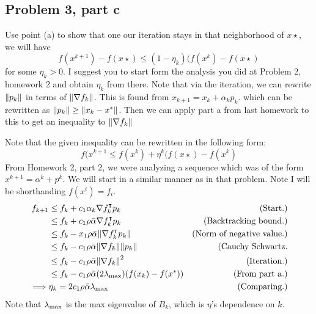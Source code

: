 \subsection{Problem 3, part c}
Use point (a) to show that one our iteration stays in that neighborhood of $x\star$, we will have
\[f(x^{k+1}) - f(x\star) \leq ( 1 - \eta_k)(f(x^k) - f(x\star)\]
for some $\eta_k > 0$. I suggest you to start form the analysis you did at Problem 2, homework 2 and obtain $\eta_k$ from there. Note that via the iteration, we can rewrite $\norm{p_k}$ in terms of $\norm{\nabla f_k}$. This is found from $x_{k+1} = x_k + \alpha_k p_k$. which can be rewritten as $\norm{p_k} \geq \norm{x_k - x^{*}}$. Then we can apply part a from last homework to this to get an inequality to $\norm{\nabla f_k}$
\partbreak
\begin{solution}

    Note that the given inequality can be rewritten in the following form:
    \[f(x^{k+1} \leq f(x^k) + \eta^k (f(x\star) - f(x^k)\]
    From Homework 2, part 2, we were analyzing a sequence which was of the form $x^{k+1} = \alpha^k + p^k$. We will start in a similar manner as in that problem. Note I will be shorthanding $f(x^i) = f_i$. 
    \tightalignbreak
    \begin{align*}
        f_{k+1} &\leq f_k + c_1\alpha_k \nabla f_k^\intercal p_k &\text{(Start.)}\\
        &\leq f_k + c_1\rho \Bar{\alpha} \nabla f_k^\intercal p_k &\text{(Backtracking bound.)}\\
        &\leq f_k - x_1\rho\Bar{\alpha} \norm{\nabla f_k^\intercal p_k} &\text{(Norm of negative value.)}\\
        &\leq f_k - c_1 \rho\Bar{\alpha}\norm{\nabla f_k} \norm{p_k} &\text{(Cauchy Schwartz.}\\
        &\leq f_k - c_1 \rho \Bar{\alpha} \norm{\nabla f_k}^2 &\text{(Iteration.)}\\
        &\leq f_k - c_1 \rho\Bar{\alpha}(2\mathrm{\lambda}_{\max})(f(x_k) - f(x^{*})) &\text{(From part a.)}\\
        \implies& \eta_k = 2c_1\rho\Bar{\alpha}\mathrm{\lambda}_{\max} &\text{(Comparing.)} 
    \end{align*}
    \vspace{-12mm}\alignbreak
    Note that $\mathrm{\lambda}_{\max}$ is the max eigenvalue of $B_k$, which is $\eta$'s dependence on $k$.
\end{solution}

\newpage
